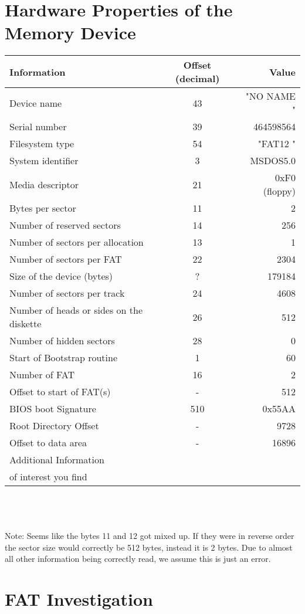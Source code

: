 \documentclass{article}
\begin{document}
\section{Hardware Properties of the Memory Device}
\begin{tabular}{l c r}
    \hline
    \textbf{Information} & \textbf{Offset (decimal)} & \textbf{Value}\\
    \hline
    Device name & 43 & "NO NAME    "\\
    Serial number & 39 & 464598564\\
    Filesystem type & 54 & "FAT12   "\\
    System identifier & 3 & MSDOS5.0\\
    Media descriptor & 21 & 0xF0 (floppy)\\
    Bytes per sector & 11 & 2\\
    Number of reserved sectors & 14 & 256\\
    Number of sectors per allocation & 13 & 1\\
    Number of sectors per FAT & 22 &2304\\
    Size of the device (bytes) & ? & 179184\\
    Number of sectors per track & 24 & 4608\\
    Number of heads or sides on the diskette & 26 & 512\\
    Number of hidden sectors & 28 & 0\\
    Start of Bootstrap routine & 1 &60\\
    Number of FAT & 16 & 2\\
    Offset to start of FAT(s) & - & 512\\
    BIOS boot Signature & 510 & 0x55AA\\
    Root Directory Offset & - & 9728\\
    Offset to data area & - & 16896\\
    Additional Information & &\\
    of interest you find & &\\
    \hline
\end{tabular}\\
\\
\\
Note: Seems like the bytes 11 and 12 got mixed up. If they were in reverse order the sector size would correctly be 512 bytes, instead it is 2 bytes. Due to almost all other information being correctly read, we assume this is just an error.

\section{FAT Investigation}
\end{document}

